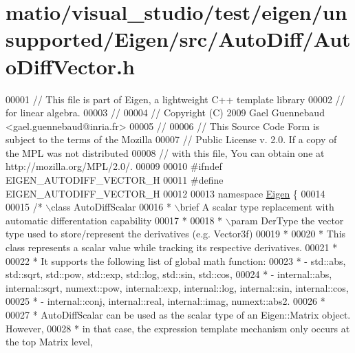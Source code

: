 \hypertarget{matio_2visual__studio_2test_2eigen_2unsupported_2_eigen_2src_2_auto_diff_2_auto_diff_vector_8h_source}{}\section{matio/visual\+\_\+studio/test/eigen/unsupported/\+Eigen/src/\+Auto\+Diff/\+Auto\+Diff\+Vector.h}
\label{matio_2visual__studio_2test_2eigen_2unsupported_2_eigen_2src_2_auto_diff_2_auto_diff_vector_8h_source}

\begin{DoxyCode}
00001 \textcolor{comment}{// This file is part of Eigen, a lightweight C++ template library}
00002 \textcolor{comment}{// for linear algebra.}
00003 \textcolor{comment}{//}
00004 \textcolor{comment}{// Copyright (C) 2009 Gael Guennebaud <gael.guennebaud@inria.fr>}
00005 \textcolor{comment}{//}
00006 \textcolor{comment}{// This Source Code Form is subject to the terms of the Mozilla}
00007 \textcolor{comment}{// Public License v. 2.0. If a copy of the MPL was not distributed}
00008 \textcolor{comment}{// with this file, You can obtain one at http://mozilla.org/MPL/2.0/.}
00009 
00010 \textcolor{preprocessor}{#ifndef EIGEN\_AUTODIFF\_VECTOR\_H}
00011 \textcolor{preprocessor}{#define EIGEN\_AUTODIFF\_VECTOR\_H}
00012 
00013 \textcolor{keyword}{namespace }\hyperlink{namespace_eigen}{Eigen} \{
00014 
00015 \textcolor{comment}{/* \(\backslash\)class AutoDiffScalar}
00016 \textcolor{comment}{  * \(\backslash\)brief A scalar type replacement with automatic differentation capability}
00017 \textcolor{comment}{  *}
00018 \textcolor{comment}{  * \(\backslash\)param DerType the vector type used to store/represent the derivatives (e.g. Vector3f)}
00019 \textcolor{comment}{  *}
00020 \textcolor{comment}{  * This class represents a scalar value while tracking its respective derivatives.}
00021 \textcolor{comment}{  *}
00022 \textcolor{comment}{  * It supports the following list of global math function:}
00023 \textcolor{comment}{  *  - std::abs, std::sqrt, std::pow, std::exp, std::log, std::sin, std::cos,}
00024 \textcolor{comment}{  *  - internal::abs, internal::sqrt, numext::pow, internal::exp, internal::log, internal::sin,
       internal::cos,}
00025 \textcolor{comment}{  *  - internal::conj, internal::real, internal::imag, numext::abs2.}
00026 \textcolor{comment}{  *}
00027 \textcolor{comment}{  * AutoDiffScalar can be used as the scalar type of an Eigen::Matrix object. However,}
00028 \textcolor{comment}{  * in that case, the expression template mechanism only occurs at the top Matrix level,}

\end{DoxyCode}
